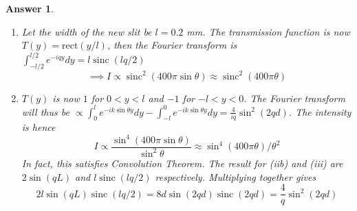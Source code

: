 \documentclass[a4paper]{article}
\DeclareMathOperator{\sinc}{sinc}
\newtheorem{ans}{Answer}[subsection]
\theoremstyle{new}
\begin{document}
\begin{ans}
\begin{enumerate}[label=(\roman*)]
\begin{enumerate}[label=(\alph*)]
\begin{center}
\end{center}
\end{enumerate}
\item Let the width of the new slit be $l=0.2$ mm. The transmission function is now $T(y)=\text{rect}(y/l)$, then the Fourier transform is $\int_{-l/2}^{l/2}e^{-iqy}dy=l\sinc(lq/2)$
$$\implies I\propto\sinc^2(400\pi\sin\theta)\approx\sinc^2(400\pi\theta)$$
\begin{center}
\end{center}
\item $T(y)$ is now $1$ for $0<y<l$ and $-1$ for $-l<y<0$. The Fourier transform will thus be $\propto\int_0^{l}e^{-ik\sin\theta y}dy-\int_{-l}^0e^{-ik\sin\theta y}dy=\frac{4}{iq}\sin^2(2qd)$. The intensity is hence 
$$I\propto\frac{\sin^4(400\pi\sin\theta)}{\sin^2\theta}\approx\sin^4(400\pi\theta)/\theta^2$$
In fact, this satisfies Convolution Theorem. The result for (iib) and (iii) are $2\sin(qL)$ and $l\sinc(lq/2)$ respectively. Multiplying together gives $$2l\sin(qL)\sinc(lq/2)=8d\sin(2qd)\sinc(2qd)=\frac{4}{q}\sin^2(2qd)$$
\begin{center}
\end{center}
\end{enumerate}
\end{ans}
\newpage
\end{document}
